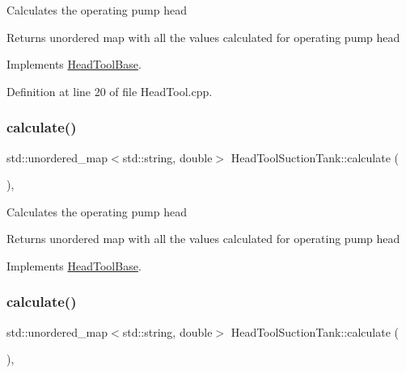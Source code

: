 Calculates the operating pump head

\begin{DoxyReturn}{Returns}
unordered map with all the values calculated for operating pump head 
\end{DoxyReturn}


Implements \hyperlink{class_head_tool_base_ab8df8f908827ce45dc5e769ea0e10f0b}{Head\+Tool\+Base}.



Definition at line 20 of file Head\+Tool.\+cpp.

\mbox{\label{class_head_tool_suction_tank_a7e4a6931caa7c9be43992aecdfb80bec}} 
\subsubsection{\texorpdfstring{calculate()}{calculate()}\hspace{0.1cm}{\footnotesize\ttfamily [2/3]}}
{\footnotesize\ttfamily std\+::unordered\+\_\+map$<$std\+::string, double$>$ Head\+Tool\+Suction\+Tank\+::calculate (\begin{DoxyParamCaption}{ }\end{DoxyParamCaption})\hspace{0.3cm}{\ttfamily [override]}, {\ttfamily [virtual]}}

Calculates the operating pump head

\begin{DoxyReturn}{Returns}
unordered map with all the values calculated for operating pump head 
\end{DoxyReturn}


Implements \hyperlink{class_head_tool_base_ab8df8f908827ce45dc5e769ea0e10f0b}{Head\+Tool\+Base}.

\mbox{\label{class_head_tool_suction_tank_a7e4a6931caa7c9be43992aecdfb80bec}} 
\subsubsection{\texorpdfstring{calculate()}{calculate()}\hspace{0.1cm}{\footnotesize\ttfamily [3/3]}}
{\footnotesize\ttfamily std\+::unordered\+\_\+map$<$std\+::string, double$>$ Head\+Tool\+Suction\+Tank\+::calculate (\begin{DoxyParamCaption}{ }\end{DoxyParamCaption})\hspace{0.3cm}{\ttfamily [override]}, {\ttfamily [virtual]}}

